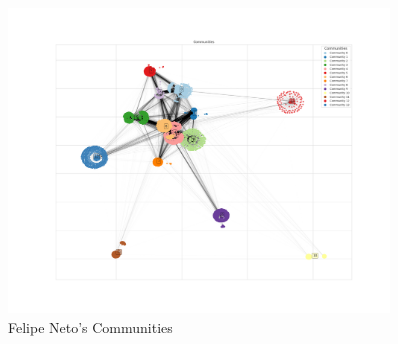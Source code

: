 \documentclass[12pt]{article}
\begin{document}
\begin{figure}[t!]
    \centering
    \includegraphics[keepaspectratio,width=0.9\textwidth]{./imgs/felipeneto/communities.png}
    \caption[width=\textwidth]{Felipe Neto's Communities}
    \label{fig:felipeneto_comm}
\end{figure}




\end{document}
